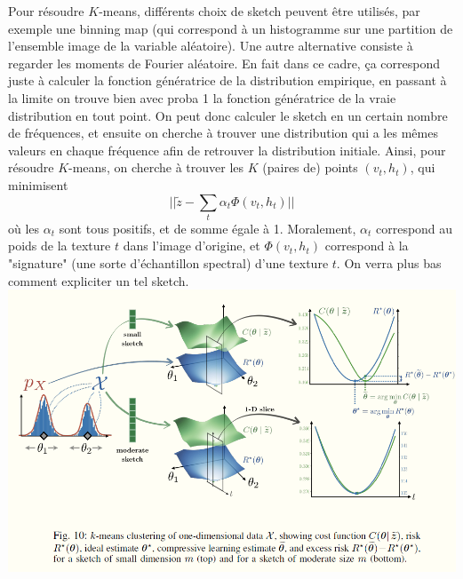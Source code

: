 \documentclass[11pt]{article} %
\begin{document}
Pour résoudre $K$-means, différents choix de sketch peuvent être utilisés, par exemple une binning map (qui correspond à un histogramme sur une partition de l'ensemble image de la variable aléatoire). Une autre alternative consiste à regarder les moments de Fourier aléatoire. En fait dans ce cadre, ça correspond juste à calculer la fonction génératrice de la distribution empirique, en passant à la limite on trouve bien avec proba 1 la fonction génératrice de la vraie distribution en tout point. On peut donc calculer le sketch en un certain nombre de fréquences, et ensuite on cherche à trouver une distribution qui a les mêmes valeurs en chaque fréquence afin de retrouver la distribution initiale. Ainsi, pour résoudre $K$-means, on cherche à trouver les $K$ (paires de) points $(v_t, h_t)$, qui minimisent
\begin{equation}\label{eq:prob1}
	||\tilde z - \sum_{t} \alpha_t \Phi(v_t, h_t)||
\end{equation} 
où les $\alpha_t$ sont tous positifs, et de somme égale  à 1. Moralement, $\alpha_t$ correspond au poids de la texture $t$ dans l'image d'origine, et $\Phi(v_t,h_t)$ correspond à la "signature" (une sorte d'échantillon spectral) d'une texture $t$. On verra plus bas comment expliciter un tel sketch.
\newline
\includegraphics[width=\textwidth]{sketching_risk}
\end{document}
